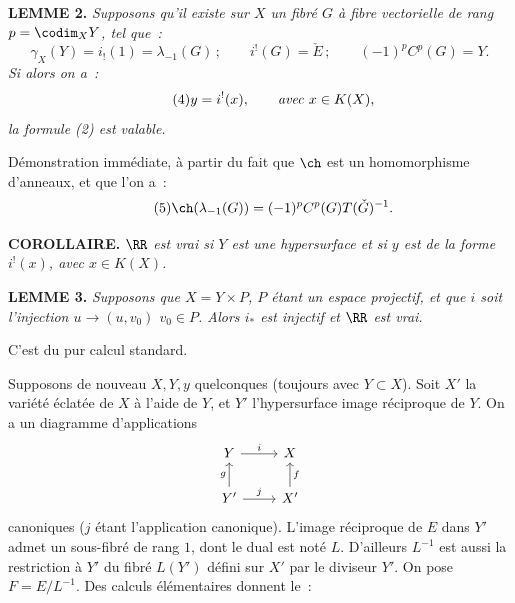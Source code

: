 \textbf{LEMME 2.} \emph{Supposons qu'il existe sur \(X\) un fibré \(G\) à fibre vectorielle de rang \(p=\codim_XY\), tel que~:}
\begin{equation}\tag{3}
  \gamma_X(Y)=i_!(1)=\lambda_{-1}(G)\,;\qquad
  i^!(G)=\check E\,;\qquad
  (-1)^pC^p(G)=Y.
\end{equation}
\emph{Si alors on a~:}
\begin{equation}\tag{4}
  y=i^!(x),\qquad \text{\emph{avec} }x\in K(X),
\end{equation}
\emph{la formule (2) est valable.}

Démonstration immédiate, à partir du fait que \(\ch\) est un homomorphisme d'anneaux, et que l'on a~:
\begin{equation}\tag{5}
  \ch(\lambda_{-1}(G))=(-1)^pC^p(G)T(\check G)^{-1}.
\end{equation}

\textbf{COROLLAIRE.} \emph{\(\RR\) est vrai si \(Y\) est une hypersurface et si \(y\) est de la forme \(i^!(x)\), avec \(x\in K(X)\).}

\textbf{LEMME 3.} \emph{Supposons que \(X=Y\times P\), \(P\) étant un espace projectif, et que \(i\) soit l'injection \(u\longrightarrow (u,v_0)\) \(v_0\in P\). Alors \(i_*\) est injectif et \(\RR\) est vrai.}

C'est du pur calcul standard.

Supposons de nouveau \(X,Y,y\) quelconques (toujours avec \(Y\subset X\)). Soit \(X'\) la variété éclatée de \(X\) à l'aide de \(Y\), et \(Y'\) l'hypersurface image réciproque de \(Y\). On a un diagramme d'applications
\[
\begin{tikzcd}
Y \arrow[r,"i"] & X\\
Y' \arrow[u,"g"] \arrow[r,"j"] & X' \arrow[u,"f"']
\end{tikzcd}
\]
canoniques (\(j\) étant l'application canonique). L'image réciproque de \(E\) dans \(Y'\) admet un sous-fibré de rang \(1\), dont le dual est noté \(L\). D'ailleurs \(L^{-1}\) est aussi la restriction à \(Y'\) du fibré \(L(Y')\) défini sur \(X'\) par le diviseur \(Y'\). On pose \(F=E/L^{-1}\). Des calculs élémentaires donnent le~:

